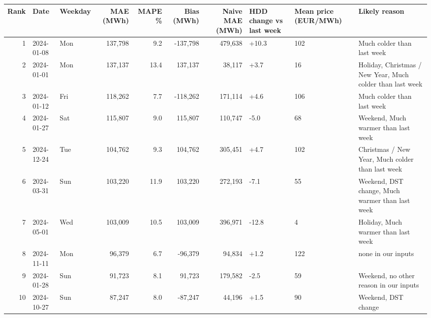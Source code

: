 \begin{tabular}{rllrrrrlll}
\toprule
Rank & Date & Weekday & MAE (MWh) & MAPE \% & Bias (MWh) & Naive MAE (MWh) & HDD change vs last week & Mean price (EUR/MWh) & Likely reason \\
\midrule
1 & 2024-01-08 & Mon & 137,798 & 9.2 & -137,798 & 479,638 & +10.3 & 102 & Much colder than last week \\
2 & 2024-01-01 & Mon & 137,137 & 13.4 & 137,137 & 38,117 & +3.7 & 16 & Holiday, Christmas / New Year, Much colder than last week \\
3 & 2024-01-12 & Fri & 118,262 & 7.7 & -118,262 & 171,114 & +4.6 & 106 & Much colder than last week \\
4 & 2024-01-27 & Sat & 115,807 & 9.0 & 115,807 & 110,747 & -5.0 & 68 & Weekend, Much warmer than last week \\
5 & 2024-12-24 & Tue & 104,762 & 9.3 & 104,762 & 305,451 & +4.7 & 102 & Christmas / New Year, Much colder than last week \\
6 & 2024-03-31 & Sun & 103,220 & 11.9 & 103,220 & 272,193 & -7.1 & 55 & Weekend, DST change, Much warmer than last week \\
7 & 2024-05-01 & Wed & 103,009 & 10.5 & 103,009 & 396,971 & -12.8 & 4 & Holiday, Much warmer than last week \\
8 & 2024-11-11 & Mon & 96,379 & 6.7 & -96,379 & 94,834 & +1.2 & 122 & none in our inputs \\
9 & 2024-01-28 & Sun & 91,723 & 8.1 & 91,723 & 179,582 & -2.5 & 59 & Weekend, no other reason in our inputs \\
10 & 2024-10-27 & Sun & 87,247 & 8.0 & -87,247 & 44,196 & +1.5 & 90 & Weekend, DST change \\
\bottomrule
\end{tabular}
